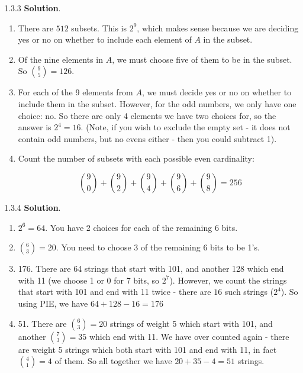 \documentclass[11pt,]{book}
\theoremstyle{ptxplainnotitle}
\theoremstyle{ptxplaintitle}
\theoremstyle{ptxdefinitionnotitle}
\theoremstyle{ptxdefinitiontitle}
\theoremstyle{ptxdefinitionnotitle}
\theoremstyle{ptxdefinitiontitle}
\theoremstyle{ptxdefinitionnotitle}
\theoremstyle{ptxdefinitiontitle}
\theoremstyle{ptxdefinitiontitlenonumber}
\theoremstyle{ptxdefinitiontitlenonumber}
\numberwithin{equation}{chapter}
\begin{document}
\begin{divisionexercise}{1.3.3}
\textbf{Solution}.\quad%
\hypertarget{p-1375}{}%
\leavevmode%
\begin{enumerate}[label=\alph*.]
\item\hypertarget{li-597}{}\hypertarget{p-1376}{}%
There are \(512\) subsets. This is \(2^9\text{,}\) which makes sense because we are deciding yes or no on whether to include each element of \(A\) in the subset.%
\item\hypertarget{li-598}{}\hypertarget{p-1377}{}%
Of the nine elements in \(A\text{,}\) we must choose five of them to be in the subset. So \({9 \choose 5} = 126\text{.}\)%
\item\hypertarget{li-599}{}\hypertarget{p-1378}{}%
For each of the 9 elements from \(A\text{,}\) we must decide yes or no on whether to include them in the subset. However, for the odd numbers, we only have one choice: no. So there are only 4 elements we have two choices for, so the answer is \(2^4 = 16\text{.}\) (Note, if you wish to exclude the empty set - it does not contain odd numbers, but no evens either - then you could subtract 1).%
\item\hypertarget{li-600}{}\hypertarget{p-1379}{}%
Count the number of subsets with each possible even cardinality:%
\par
\hypertarget{p-1380}{}%
%
\begin{equation*}
{9 \choose 0} + {9 \choose 2} + {9\choose 4} + {9 \choose 6} + {9 \choose 8} = 256
\end{equation*}
%
\end{enumerate}
%
\end{divisionexercise}%
\begin{divisionexercise}{1.3.4}
\textbf{Solution}.\quad%
\hypertarget{p-1404}{}%
\leavevmode%
\begin{enumerate}[label=\alph*.]
\item\hypertarget{li-613}{}\hypertarget{p-1405}{}%
\(2^6 = 64\text{.}\) You have 2 choices for each of the remaining 6 bits.%
\item\hypertarget{li-614}{}\hypertarget{p-1406}{}%
\({6 \choose 3} = 20\text{.}\) You need to choose 3 of the remaining 6 bits to be 1's.%
\item\hypertarget{li-615}{}\hypertarget{p-1407}{}%
176. There are 64 strings that start with 101, and another 128 which end with 11 (we choose 1 or 0 for 7 bits, so \(2^7\)). However, we count the strings that start with 101 and end with 11 twice - there are \(16\) such strings (\(2^4\)). So using PIE, we have \(64 + 128 - 16 = 176\)%
\item\hypertarget{li-616}{}\hypertarget{p-1408}{}%
51. There are \({6 \choose 3} = 20\) strings of weight 5 which start with 101, and another \({7 \choose 3} = 35\) which end with 11. We have over counted again - there are weight 5 strings which both start with 101 and end with 11, in fact \({4 \choose 1} = 4\) of them. So all together we have \(20 + 35 - 4 = 51\) strings.%
\end{enumerate}
%
\end{divisionexercise}%
\end{document}
